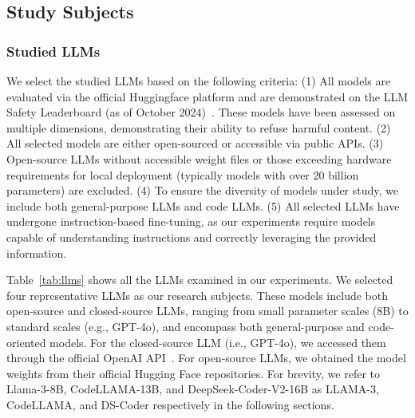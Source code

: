 
\subsection{Study Subjects}
\subsubsection{Studied LLMs}
\label{subsec:llms}
We select the studied LLMs based on the following criteria: (1) All models are evaluated via the official Huggingface platform and are demonstrated on the LLM Safety Leaderboard (as of October 2024)~\cite{SecureLearningLab2024}. These models have been assessed on multiple dimensions, demonstrating their ability to refuse harmful content. (2) All selected models are either open-sourced or accessible via public APIs. (3) Open-source LLMs without accessible weight files or those exceeding hardware requirements for local deployment (typically models with over 20 billion parameters) are excluded. (4) To ensure the diversity of models under study, we include both general-purpose LLMs and code LLMs. (5) All selected LLMs have undergone instruction-based fine-tuning, as our experiments require models capable of understanding instructions and correctly leveraging the provided information.


Table~\ref{tab:llms} shows all the LLMs examined in our experiments. We selected four representative LLMs as our research subjects. These models include both open-source and closed-source LLMs, ranging from small parameter scales (\eg 8B) to standard scales (e.g., GPT-4o), and encompass both general-purpose and code-oriented models.
For the closed-source LLM (i.e., GPT-4o), we accessed them through the official OpenAI API~\cite{openai2024apin}. For open-source LLMs, we obtained the model weights from their official Hugging Face repositories. For brevity, we refer to Llama-3-8B, CodeLLAMA-13B, and DeepSeek-Coder-V2-16B as LLAMA-3, CodeLLAMA, and DS-Coder respectively in the following sections.

